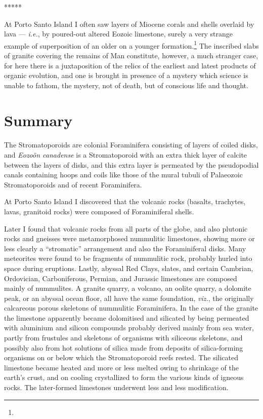 \documentclass[a4paper, 12pt, oneside]{article}
\begin{document}
\centerline{*\hspace{15mm}*\hspace{15mm}*\hspace{15mm}*\hspace{15mm}*}
\bigskip

At Porto Santo Island I often saw layers of Miocene corals and shells overlaid by lava --- \emph{i.e.}, by poured-out altered Eozoic limestone, surely a very strange example of superposition of an older on a younger formation.\footnote{} The inscribed slabs of granite covering the remains of Man constitute, however, a much stranger case, for here there is a juxtaposition of the relics of the earliest and latest products of organic evolution, and one is brought in presence of a mystery which science is unable to fathom, the mystery, not of death, but of conscious life and thought.
\clearpage
\section{Summary}
\paragraph{}
The Stromatoporoids are colonial Foraminifera consisting of layers of coiled disks, and \emph{Eozoön canadense} is a Stromatoporoid with an extra thick layer of calcite between the layers of disks, and this extra layer is permeated by the pseudopodial canals containing hoops and coils like those of the mural tubuli of Palaeozoic Stromatoporoids and of recent Foraminifera.

At Porto Santo Island I discovered that the volcanic rocks (basalts, trachytes, lavas, granitoid rocks) were composed of Foraminiferal shells.

Later I found that volcanic rocks from all parts of the globe, and also plutonic rocks and gneisses were metamorphosed nummulitic limestones, showing more or less clearly a ``stromatic'' arrangement and also the Foraminiferal disks. Many meteorites were found to be fragments of nummulitic rock, probably hurled into space during eruptions. Lastly, abyssal Red Clays, slates, and certain Cambrian, Ordovician, Carboniferous, Permian, and Jurassic limestones are composed mainly of nummulites. A granite quarry, a volcano, an oolite quarry, a dolomite peak, or an abyssal ocean floor, all have the same foundation, \emph{viz.}, the originally calcareous porous skeletons of nummulitic Foraminifera. In the case of the granite the limestone apparently became dolomitised and silicated by being permeated with aluminium and silicon compounds probably derived mainly from sea water, partly from frustules and skeletons of organisms with siliceous skeletons, and possibly also from hot solutions of silica made from deposits of silica-forming organisms on or below which the Stromatoporoid reefs rested. The silicated limestone became heated and more or less melted owing to shrinkage of the earth's crust, and on cooling crystallized to form the various kinds of igneous rocks. The later-formed limestones underwent less and less modification.
\end{document}
